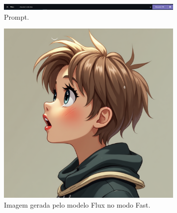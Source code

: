 \begin{figure}[htbp]
    \centering
    \caption{\small Processo da utilização 7 do CGDream (Personagem)}
    \label{fig:cgDream7}
    \begin{subfigure}{1\linewidth}
        \includegraphics[width=1\linewidth]{figs/cgDream/tela_prompt_char.PNG}
        \caption{\small Prompt.}
        \label{fig:cgDream7a}
    \end{subfigure}
    \begin{subfigure}{0.45\linewidth}
        \centering
        \includegraphics[width=1\linewidth]{figs/cgDream/res_char_fluxFast1.png}
        \caption{\small Imagem gerada pelo modelo Flux no modo Fast.}
        \label{fig:cgDream7b}
    \end{subfigure}
    \begin{subfigure}{0.45\linewidth}
        \centering

\end{subfigure}
\end{figure}
